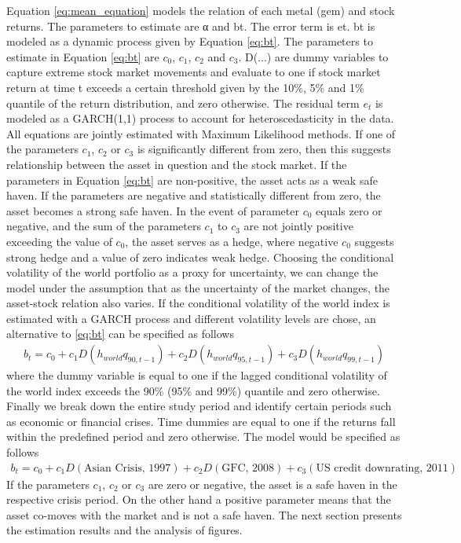 \documentclass[preprint,authoryear,11pt]{elsarticle}
\begin{document}
\noindent Equation \eqref{eq:mean_equation} models the relation of each metal (gem) and stock returns. The parameters to estimate are α and bt. The error term is et. bt is modeled as a dynamic process given by Equation \eqref{eq:bt}. The parameters to estimate in Equation \eqref{eq:bt} are $c_{0}$, $c_{1}$, $c_{2}$ and $c_{3}$. D(...) are dummy variables to capture extreme stock market movements and evaluate to one if stock market return at time t exceeds a certain threshold given by the 10\%, 5\% and 1\% quantile of the return distribution, and zero otherwise. The residual term $e_{t}$ is modeled as a GARCH(1,1) process to account for heteroscedasticity in the data. All equations are jointly estimated with Maximum Likelihood methods. If one of the parameters $c_{1}$, $c_{2}$ or $c_{3}$ is significantly different from zero, then this suggests relationship between the asset in question and the stock market. If the parameters in Equation \eqref{eq:bt} are non-positive, the asset acts as a weak safe haven. If the parameters are negative and statistically different from zero, the asset becomes a strong safe haven. In the event of parameter $c_{0}$ equals zero or negative, and the sum of the parameters $c_{1}$ to $c_{3}$ are not jointly positive exceeding the value of $c_{0}$, the asset serves as a hedge, where negative $c_{0}$ suggests strong hedge and a value of zero indicates weak hedge. \newline
\noindent Choosing the conditional volatility of the world portfolio as a proxy for uncertainty, we can change the model under the assumption that as the uncertainty of the market changes, the asset-stock relation also varies. If the conditional volatility of the world index is estimated with a GARCH process and different volatility levels are chose, an alternative to \eqref{eq:bt} can be specified as follows
\begin{align}
	b_{t} = c_{0} + c_{1}D(h_{world}q_{90,t-1}) + c_{2}D(h_{world}q_{95,t-1}) + c_{3}D(h_{world}q_{99,t-1}) \label{eq:vol}
\end{align}
where the dummy variable is equal to one if the lagged conditional volatility of the world index exceeds the 90\% (95\% and 99\%) quantile and zero otherwise. \newline
\noindent Finally we break down the entire study period and identify certain periods such as economic or financial crises. Time dummies are equal to one if the returns fall within the predefined period and zero otherwise. The model would be specified as follows
\begin{align}
	 b_{t} = c_{0} + c_{1}D(\text{Asian Crisis, 1997}) + c_{2}D(\text{GFC, 2008}) + c_{3}(\text{US credit downrating, 2011}) \label{eq:crisis}
\end{align}
\noindent If the parameters $c_{1}$, $c_{2}$ or $c_{3}$ are zero or negative, the asset is a safe haven in the respective crisis period. On the other hand a positive parameter means that the asset co-moves with the market and is not a safe haven. \newline
\noindent The next section presents the estimation results and the analysis of figures.
\end{document}
